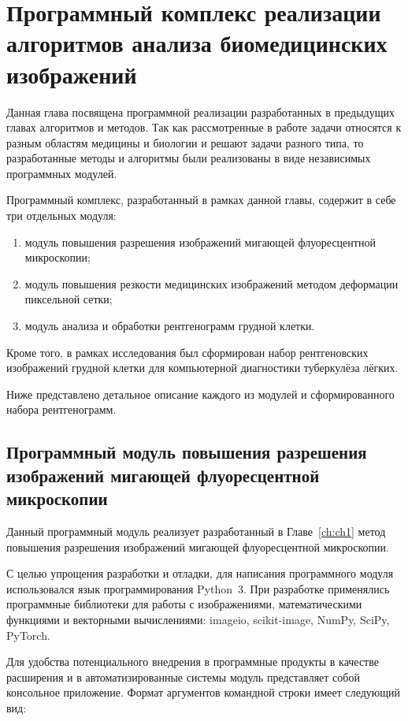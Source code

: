 \chapter{Программный комплекс реализации алгоритмов анализа биомедицинских изображений}\label{ch:ch4}

Данная глава посвящена программной реализации разработанных в предыдущих главах алгоритмов и методов. Так как рассмотренные в работе задачи относятся к разным областям медицины и биологии и решают задачи разного типа, то разработанные методы и алгоритмы были реализованы в виде независимых программных модулей.

Программный комплекс, разработанный в рамках данной главы, содержит в себе три отдельных модуля:
\begin{enumerate}[beginpenalty=10000]
	\item модуль повышения разрешения изображений мигающей флуоресцентной микроскопии;
	
	\item модуль повышения резкости медицинских изображений методом деформации пиксельной сетки;
	
	\item модуль анализа и обработки рентгенограмм грудной клетки.
\end{enumerate}

Кроме того, в рамках исследования был сформирован набор рентгеновских изображений грудной клетки для компьютерной диагностики туберкулёза лёгких.

Ниже представлено детальное описание каждого из модулей и сформированного набора рентгенограмм.
 
\section{Программный модуль повышения разрешения изображений мигающей флуоресцентной микроскопии}

Данный программный модуль реализует разработанный в Главе~\ref{ch:ch1} метод повышения разрешения изображений мигающей флуоресцентной микроскопии.

С целью упрощения разработки и отладки, для написания программного модуля использовался язык программирования Python~3. При разработке применялись программные библиотеки для работы с изображениями, математическими функциями и векторными вычислениями: imageio, scikit-image, NumPy, SciPy, PyTorch.

Для удобства потенциального внедрения в программные продукты в качестве расширения и в автоматизированные системы модуль представляет собой консольное приложение. Формат аргументов командной строки имеет следующий вид:

